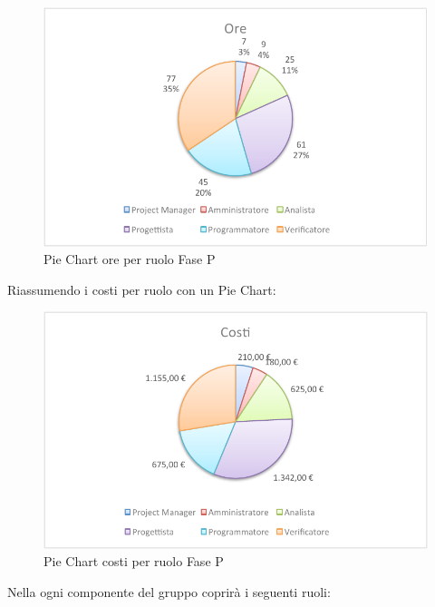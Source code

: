 				\begin{figure}[H]\centering
					\includegraphics[width=\textwidth]{PianoDiProgetto/Pics/ChartTotOreFaseP.pdf}
					\caption{Pie Chart ore per ruolo Fase P}
				\end{figure}
				Riassumendo i costi per ruolo con un Pie Chart:
				\begin{figure}[H]\centering
					\includegraphics[width=\textwidth]{PianoDiProgetto/Pics/ChartTotCostiFaseP.pdf}
					\caption{Pie Chart costi per ruolo Fase P}
				\end{figure}
				Nella  ogni componente del gruppo \groupname{} coprirà i seguenti ruoli:
